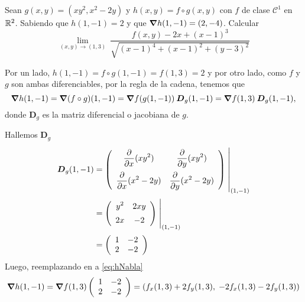 \begin{solution}
    Sean $g(x,y)=(xy^2,x^2-2y)$ y $h(x,y)=f \circ g(x,y)$ con $f$ de clase $\mathcal{C}^1$ en $\mathbb{R}^2$. Sabiendo que $h(1,-1)=2$ y que $\grad h(1,-1)=(2,-4)$. Calcular
    \[
        \lim_{(x,y)\to (1,3)} \ 
        \frac{f(x,y)-2x+(x-1)^3}{\sqrt{(x-1)^4+(x-1)^2+(y-3)^2}}       
    \]

 Por un lado,      $h(1,-1)= f\circ g (1,-1) =  f(1,3)=2$  y por otro lado,  como $f$ y $g$ son ambas diferenciables,  por la regla de la cadena,  tenemos que
    \begin{equation}
        \grad h(1,-1)=\grad (f\circ g)(1,-1)=\grad f(g(1,-1)) \:\boldsymbol{D}_g(1,-1) = \grad f (1,3) \:\boldsymbol{D}_g(1,-1),  \label{eq:hNabla}
    \end{equation}    donde $\boldsymbol{D}_g$ es la matriz diferencial o  jacobiana de $g$.

    
    \noindent  Hallemos $\boldsymbol{D}_g$
    \begin{align*}
        \boldsymbol{D}_g(1,-1) & =
        \left(\begin{array}{cc}
                      \displaystyle\partialx (xy^2)            & \displaystyle\partialy (xy^2)           \\[10pt]
                      \displaystyle\partialx  (x^2 -2y) & \displaystyle\partialy (x^2 -2y)
                  \end{array}\right)\left.\rule{0pt}{1.1cm}\right\rvert_{(1,-1)}             \\[2pt]
                              & =\left(\begin{array}{cc}
                                               \displaystyle y^2                 & \displaystyle 2xy              \\[5pt]
                                               \displaystyle   2x & \displaystyle -2
                                           \end{array}\right)\left.\rule{0pt}{0.7cm}\right\rvert_{(1,-1)} \\[2pt]
                              & =\left(\begin{array}{cc}
                                               1    & -2    \\
                                               2 & -2
                                           \end{array}\right)
    \end{align*}
    Luego, reemplazando en  a   \eqref{eq:hNabla}
    \[
        \grad h(1,-1) = \grad f(1,3)\left(\begin{array}{cc}
                1   & -2    \\
                2 & -2
            \end{array}\right) = \left(f_x(1,3) + 2f_y(1,3),\;-2f_x(1,3)-2f_y(1,3)\right)
    \]


\end{solution}
